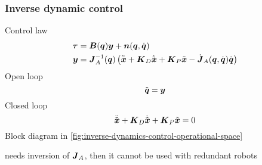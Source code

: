 \subsubsection{Inverse dynamic control}

Control law
\begin{align*}
	\vect \tau &= \B(\q)\y + \n(\q,\dq) \\
	\y &= \J_A^\inv(\q) \left( \ddxd + \K_D\dxe + \K_P \xe - \dJ_A(\q,\dq)\dq \right)
\end{align*}
Open loop
\[
	\ddq = \y
\]
Closed loop
\[
	\ddxe + \K_D \dxe + \K_P \xe = 0
\]
Block diagram in \autoref{fig:inverse-dynamics-control-operational-space}
\begin{nb}needs inversion of $\J_A$, then it cannot be used with redundant robots\end{nb}